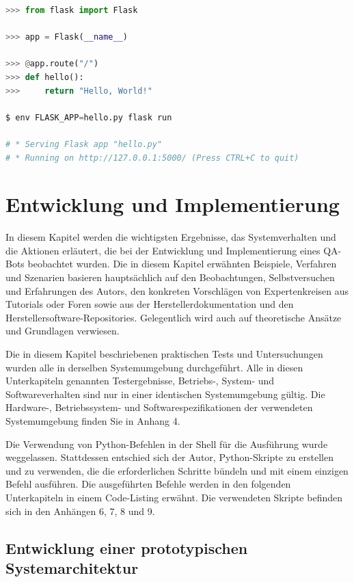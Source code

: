\documentclass[
        ngerman,
        paper=a4,
        numbers=noendperiod,
]{scrreprt}
\begin{document}
\begin{lstlisting}[language=Python, caption=Ein einfaches Flask Beispiel]
>>> from flask import Flask

>>> app = Flask(__name__)

>>> @app.route("/")
>>> def hello():
>>>     return "Hello, World!"

$ env FLASK_APP=hello.py flask run

# * Serving Flask app "hello.py"
# * Running on http://127.0.0.1:5000/ (Press CTRL+C to quit)
\end{lstlisting}

\chapter{Entwicklung und Implementierung}
In diesem Kapitel werden die wichtigsten Ergebnisse, das Systemverhalten und die Aktionen erläutert, die bei der Entwicklung und Implementierung eines QA-Bots beobachtet wurden. Die in diesem Kapitel erwähnten Beispiele, Verfahren und Szenarien basieren hauptsächlich auf den Beobachtungen, Selbstversuchen und Erfahrungen des Autors, den konkreten Vorschlägen von Expertenkreisen aus Tutorials oder Foren sowie aus der Herstellerdokumentation und den Herstellersoftware-Repositories. Gelegentlich wird auch auf theoretische Ansätze und Grundlagen verwiesen.

Die in diesem Kapitel beschriebenen praktischen Tests und Untersuchungen wurden alle in derselben Systemumgebung durchgeführt. Alle in diesen Unterkapiteln genannten Testergebnisse, Betriebs-, System- und Softwareverhalten sind nur in einer identischen Systemumgebung gültig. Die Hardware-, Betriebssystem- und Softwarespezifikationen der verwendeten Systemumgebung finden Sie in Anhang 4. %

Die Verwendung von Python-Befehlen in der Shell für die Ausführung wurde weggelassen. Stattdessen entschied sich der Autor, Python-Skripte zu erstellen und zu verwenden, die die erforderlichen Schritte bündeln und mit einem einzigen Befehl ausführen. Die ausgeführten Befehle werden in den folgenden Unterkapiteln in einem Code-Listing erwähnt. Die verwendeten Skripte befinden sich in den Anhängen 6, 7, 8 und 9. %


\section{Entwicklung einer prototypischen Systemarchitektur}
\end{document}

